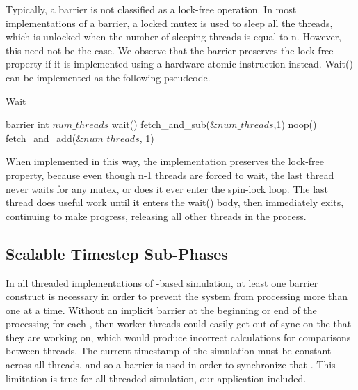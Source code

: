 \documentclass[CEJCS,PDF]{cej} %
\begin{document}
Typically, a barrier is not classified as a lock-free operation.  In most implementations of a barrier, a locked mutex is used to sleep all the threads, which is 
unlocked when the number of sleeping threads is equal to n.  However, this need not be the case.  We observe that the barrier preserves the lock-free property if it is implemented
using a hardware atomic instruction instead.  Wait() can be implemented as the following pseudcode.

\begin{algorithm}
\label{barrier}
\caption{Wait}
\begin{algorithmic}
\STATE barrier
	\STATE int $num\_threads$ 
	\STATE wait()
	\STATE {}
	\STATE fetch\_and\_sub($\&num\_threads$,1)
	\STATE {}
		\STATE noop()
	\ENDWHILE
	\STATE {}
	\STATE fetch\_and\_add($\&num\_threads$, 1)
\end{algorithmic}
\end{algorithm}

When implemented in this way, the implementation preserves the lock-free property, because even though n-1 threads are forced to wait, the last thread never waits for any 
mutex, or does it ever enter the spin-lock loop.  The last thread does useful work until it enters the wait() body, then immediately exits, continuing to make progress, releasing all
other threads in the process.

\subsection{Scalable Timestep Sub-Phases}
\label{sec:stsp}
In all threaded implementations of -based simulation, at least one barrier construct
is necessary in order to prevent the system from processing more than one  at a time.  Without an implicit barrier at the beginning or end of the 
processing for each , then worker threads could easily get out of sync on the  that they are working on, which would produce incorrect calculations
for comparisons between threads.  The current timestamp of the simulation must be constant across all threads, and so a barrier is used in order to synchronize that .  This
limitation is true for all threaded  simulation, our application included.
\end{document}
